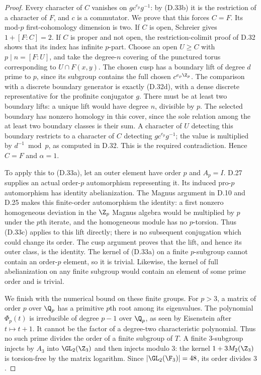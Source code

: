 \begin{proof}
Every character of $C$ vanishes on $g c^{e_p}g^{-1}$:
by (D.33b) it is the restriction of a character of $F$,
and $c$ is a commutator.  We prove that this forces $C=F$.
Its mod-$p$ first-cohomology dimension is two.  If $C$ is
open, Schreier gives $1+[F:C]=2$.  If $C$ is proper and
not open, the restriction-colimit proof of D.32 shows that
its index has infinite $p$-part.  Choose an open $U\geq C$
with $p\mid n=[F:U]$, and take the degree-$n$ covering of
the punctured torus corresponding to $U\cap F(x,y)$.
The chosen cusp has a boundary lift of degree $d$ prime
to $p$, since its subgroup contains the full chosen
$c^{e_p\Z_p}$.  The comparison with a discrete boundary
generator is exactly (D.32d), with a dense discrete
representative for the profinite conjugator $g$.
There must be at least two boundary lifts: a unique lift
would have degree $n$, divisible by $p$.
The selected boundary has nonzero homology in this cover,
since the sole relation among the at least two boundary
classes is their sum.  A character of $U$ detecting this
boundary restricts to a character of $C$ detecting
$g c^{e_p}g^{-1}$; the value is multiplied by
$d^{-1}\bmod p$, as computed in D.32.  This is the required
contradiction.  Hence $C=F$ and $\alpha=1$.

To apply this to (D.33a), let an outer element have order
$p$ and $A_p=I$.  D.27 supplies an actual order-$p$
automorphism representing it.  Its induced pro-$p$
automorphism has identity abelianization.  The Magnus
argument in D.10 and D.25 makes this finite-order
automorphism the identity: a first nonzero homogeneous
deviation in the $\Z_p$ Magnus algebra would be multiplied
by $p$ under the $p$th iterate, and the homogeneous module
has no $p$-torsion.  Thus (D.33c) applies to this lift
directly; there is no subsequent conjugation which could
change its order.  The cusp argument proves that the lift,
and hence its outer class, is the identity.
The kernel of (D.33a) on a finite $p$-subgroup cannot
contain an order-$p$ element, so it is trivial.  Likewise,
the kernel of full abelianization on any finite subgroup
would contain an element of some prime order and is trivial.

We finish with the numerical bound on these finite groups.
For $p>3$, a matrix of order $p$ over $\Q_p$ has a primitive
$p$th root among its eigenvalues.  The polynomial
$\Phi_p(t)$ is irreducible of degree $p-1$ over $\Q_p$,
as seen by Eisenstein after $t\mapsto t+1$.  It cannot be
the factor of a degree-two characteristic polynomial.
Thus no such prime divides the order of a finite subgroup
of $T$.  A finite $3$-subgroup injects by $A_3$ into
$\GL_2(\Z_3)$ and then injects modulo $3$: the kernel
$1+3M_2(\Z_3)$ is torsion-free by the matrix logarithm.
Since $|\GL_2(\F_3)|=48$, its order divides $3$.


\end{proof}
